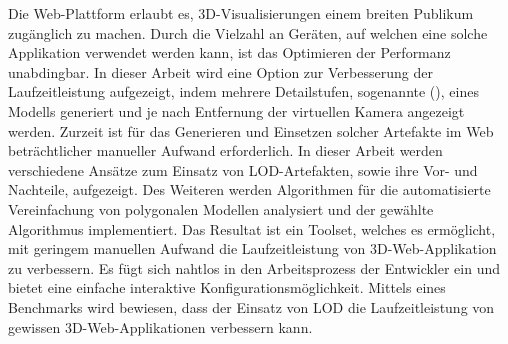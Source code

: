Die Web-Plattform erlaubt es, 3D-Visualisierungen einem breiten Publikum zugänglich zu machen. Durch die Vielzahl an Geräten, auf welchen eine solche Applikation verwendet werden kann, ist das Optimieren der Performanz unabdingbar. In dieser Arbeit wird eine Option zur Verbesserung der Laufzeitleistung aufgezeigt, indem mehrere Detailstufen, sogenannte  (), eines Modells generiert und je nach Entfernung der virtuellen Kamera angezeigt werden. Zurzeit ist für das Generieren und Einsetzen solcher Artefakte im Web beträchtlicher manueller Aufwand erforderlich.
\bigbreak
In dieser Arbeit werden verschiedene Ansätze zum Einsatz von LOD-Artefakten, sowie ihre Vor- und Nachteile, aufgezeigt.
Des Weiteren werden Algorithmen für die automatisierte Vereinfachung von polygonalen Modellen analysiert und der gewählte Algorithmus implementiert.
\bigbreak
Das Resultat ist ein Toolset, welches es ermöglicht, mit geringem manuellen Aufwand die Laufzeitleistung von 3D-Web-Applikation zu verbessern.
Es fügt sich nahtlos in den Arbeitsprozess der Entwickler ein und bietet eine einfache interaktive Konfigurationsmöglichkeit.
Mittels eines Benchmarks wird bewiesen, dass der Einsatz von LOD die Laufzeitleistung von gewissen 3D-Web-Applikationen verbessern kann.

